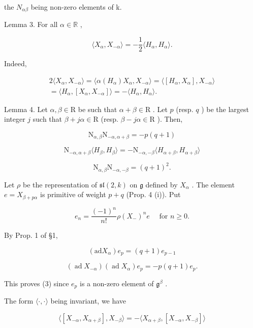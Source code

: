 the \(N_{\alpha\beta}\) being non-zero elements of k.

Lemma 3. For all \(\alpha \in \mathbb{R}\) ,

\[
\langle X _ {\alpha}, X _ {- \alpha} \rangle = - \frac {1}{2} \langle H _ {\alpha}, H _ {\alpha} \rangle .
\]

Indeed,

\[
\begin{array}{c} 2 \langle X _ {\alpha}, X _ {- \alpha} \rangle = \langle \alpha (H _ {\alpha}) X _ {\alpha}, X _ {- \alpha} \rangle = \langle [ H _ {\alpha}, X _ {\alpha} ], X _ {- \alpha} \rangle \\ = \langle H _ {\alpha}, [ X _ {\alpha}, X _ {- \alpha} ] \rangle = - \langle H _ {\alpha}, H _ {\alpha} \rangle . \end{array}
\]

Lemma 4. Let \(\alpha, \beta \in \mathrm{R}\) be such that \(\alpha + \beta \in \mathrm{R}\) . Let \(p\) (resp. \(q\) ) be the largest integer \(j\) such that \(\beta + j\alpha \in \mathrm{R}\) (resp. \(\beta - j\alpha \in \mathrm{R}\) ). Then,

\[
\mathrm{N} _ {\alpha , \beta} \mathrm{N} _ {- \alpha , \alpha + \beta} = - p (q + 1)\tag{3}
\]

\[
\mathrm{N} _ {- \alpha , \alpha + \beta} \langle H _ {\beta}, H _ {\beta} \rangle = - \mathrm{N} _ {- \alpha , - \beta} \langle H _ {\alpha + \beta}, H _ {\alpha + \beta} \rangle\tag{4}
\]

\[
\mathrm{N} _ {\alpha , \beta} \mathrm{N} _ {- \alpha , - \beta} = (q + 1) ^ {2}.\tag{5}
\]

Let \(\rho\) be the representation of \(\mathfrak{sl}(2,k)\) on \(\mathfrak{g}\) defined by \(X_{\alpha}\) . The element \(e = X_{\beta + p\alpha}\) is primitive of weight \(p + q\) (Prop. 4 (i)). Put

\[
e _ {n} = \frac {(- 1) ^ {n}}{n !} \rho (X _ {-}) ^ {n} e \quad \text { for } n \geq 0.
\]

By Prop. 1 of §1,

\[
(\mathrm{ad} X _ {\alpha}) e _ {p} = (q + 1) e _ {p - 1}
\]

\[
(\operatorname{ad} X _ {- \alpha}) (\operatorname{ad} X _ {\alpha}) e _ {p} = - p (q + 1) e _ {p}.
\]

This proves (3) since \(e_p\) is a non-zero element of \(\mathfrak{g}^{\beta}\) .

The form \(\langle \cdot, \cdot \rangle\) being invariant, we have

\[
\langle [ X _ {- \alpha}, X _ {\alpha + \beta} ], X _ {- \beta} \rangle = - \langle X _ {\alpha + \beta}, [ X _ {- \alpha}, X _ {- \beta} ] \rangle
\]

